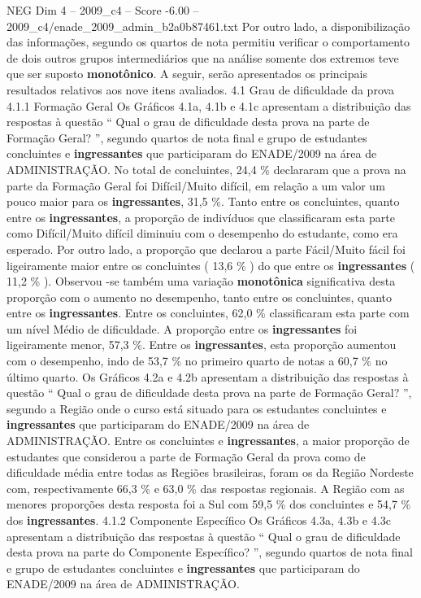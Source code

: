 \begin{textsample}{NEG Dim 4 – 2009\_c4 – Score -6.00 – 2009\_c4/enade\_2009\_admin\_b2a0b87461.txt}
Por outro lado, a disponibilização das informações, segundo os quartos de nota permitiu verificar o comportamento de dois outros grupos intermediários que na análise somente dos extremos teve que ser suposto \textbf{monotônico}.
A seguir, serão apresentados os principais resultados relativos aos nove itens avaliados. 4.1 Grau de dificuldade da prova 4.1.1 Formação Geral Os Gráficos 4.1a, 4.1b e 4.1c apresentam a distribuição das respostas à questão “ Qual o grau de dificuldade desta prova na parte de Formação Geral? ”, segundo quartos de nota final e grupo de estudantes concluintes e \textbf{ingressantes} que participaram do ENADE/2009 na área de ADMINISTRAÇÃO.
No total de concluintes, 24,4 \% declararam que a prova na parte da Formação Geral foi Difícil/Muito difícil, em relação a um valor um pouco maior para os \textbf{ingressantes}, 31,5 \%.
Tanto entre os concluintes, quanto entre os \textbf{ingressantes}, a proporção de indivíduos que classificaram esta parte como Difícil/Muito difícil diminuiu com o desempenho do estudante, como era esperado.
Por outro lado, a proporção que declarou a parte Fácil/Muito fácil foi ligeiramente maior entre os concluintes ( 13,6 \% ) do que entre os \textbf{ingressantes} ( 11,2 \% ).
Observou -se também uma variação \textbf{monotônica} significativa desta proporção com o aumento no desempenho, tanto entre os concluintes, quanto entre os \textbf{ingressantes}.
Entre os concluintes, 62,0 \% classificaram esta parte com um nível Médio de dificuldade.
A proporção entre os \textbf{ingressantes} foi ligeiramente menor, 57,3 \%.
Entre os \textbf{ingressantes}, esta proporção aumentou com o desempenho, indo de 53,7 \% no primeiro quarto de notas a 60,7 \% no último quarto.
Os Gráficos 4.2a e 4.2b apresentam a distribuição das respostas à questão “ Qual o grau de dificuldade desta prova na parte de Formação Geral? ”, segundo a Região onde o curso está situado para os estudantes concluintes e \textbf{ingressantes} que participaram do ENADE/2009 na área de ADMINISTRAÇÃO.
Entre os concluintes e \textbf{ingressantes}, a maior proporção de estudantes que considerou a parte de Formação Geral da prova como de dificuldade média entre todas as Regiões brasileiras, foram os da Região Nordeste com, respectivamente 66,3 \% e 63,0 \% das respostas regionais.
A Região com as menores proporções desta resposta foi a Sul com 59,5 \% dos concluintes e 54,7 \% dos \textbf{ingressantes}. 4.1.2 Componente Específico Os Gráficos 4.3a, 4.3b e 4.3c apresentam a distribuição das respostas à questão “ Qual o grau de dificuldade desta prova na parte do Componente Específico? ”, segundo quartos de nota final e grupo de estudantes concluintes e \textbf{ingressantes} que participaram do ENADE/2009 na área de ADMINISTRAÇÃO.

\end{textsample}
